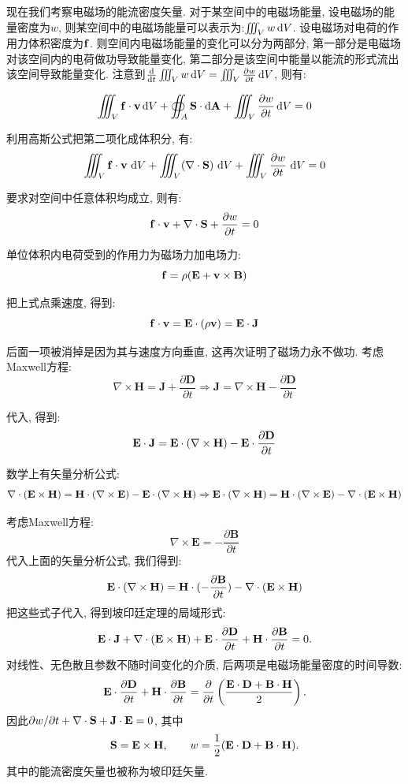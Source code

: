 现在我们考察电磁场的能流密度矢量. 对于某空间中的电磁场能量, 设电磁场的能量密度为$w$, 则某空间中的电磁场能量可以表示为:$\iiint_V w\mathop{}\!\mathrm{d} V$. 设电磁场对电荷的作用力体积密度为$\mathbf{f}$. 则空间内电磁场能量的变化可以分为两部分, 第一部分是电磁场对该空间内的电荷做功导致能量变化, 第二部分是该空间中能量以能流的形式流出该空间导致能量变化. 注意到$\frac{\mathop{}\!\mathrm{d}}{\mathop{}\!\mathrm{d} t}\iiint_V w\mathop{}\!\mathrm{d} V=\iiint_V  \frac{\partial w}{\partial t}\mathop{}\!\mathrm{d} V$, 则有:

\[
\iiint_V \mathbf{f}\cdot \mathbf{v} \mathop{}\!\mathrm{d} V + \oiint_A \mathbf{S} \cdot \mathop{}\!\mathrm{d} \mathbf{A}+\iiint_V  \frac{\partial w}{\partial t}\mathop{}\!\mathrm{d} V = 0
\]

利用高斯公式把第二项化成体积分, 有:
\[
\iiint_V \mathbf{f}\cdot \mathbf{v}\,\mathop{}\!\mathrm{d} V + \iiint_V (\nabla \cdot \mathbf{S})\,\mathop{}\!\mathrm{d} V +\iiint_V \frac{\partial w}{\partial t}\,\mathop{}\!\mathrm{d} V = 0
\]

要求对空间中任意体积均成立, 则有:
\[
 \mathbf{f}\cdot \mathbf{v}  +  \nabla \cdot \mathbf{S} + \frac{\partial w}{\partial t} = 0
\]

单位体积内电荷受到的作用力为磁场力加电场力:
\[
\mathbf{f} = \rho(\mathbf{E}+\mathbf{v}\times\mathbf{B})
\]

把上式点乘速度, 得到:
\[
\mathbf{f}\cdot \mathbf{v} = \mathbf{E} \cdot (\rho \mathbf{v}) = \mathbf{E} \cdot \mathbf{J}
\]

后面一项被消掉是因为其与速度方向垂直, 这再次证明了磁场力永不做功. 考虑Maxwell方程:
\[
\nabla\times\mathbf{H} = \mathbf{J} + \frac{\partial\mathbf{D}}{\partial t} \Rightarrow \mathbf{J} = \nabla\times\mathbf{H} - \frac{\partial\mathbf{D}}{\partial t}
\]

代入, 得到:
\[
\mathbf{E} \cdot \mathbf{J} = \mathbf{E} \cdot (\nabla\times\mathbf{H}) -  \mathbf{E} \cdot\frac{\partial\mathbf{D}}{\partial t}
\]

数学上有矢量分析公式:
\[
\nabla \cdot(\mathbf{E} \times \mathbf{H}) = \mathbf{H}\cdot(\nabla \times \mathbf{E}) - \mathbf{E}\cdot (\nabla \times \mathbf{H}) \Rightarrow \mathbf{E}\cdot (\nabla \times \mathbf{H})  = \mathbf{H}\cdot(\nabla \times \mathbf{E}) - \nabla \cdot(\mathbf{E} \times \mathbf{H})
\]

考虑Maxwell方程:
\[
\nabla\times\mathbf{E} = -\frac{\partial\mathbf{B}}{\partial t}
\]
代入上面的矢量分析公式, 我们得到:
\[
\mathbf{E}\cdot (\nabla \times \mathbf{H}) = \mathbf{H}\cdot (-\frac{\partial\mathbf{B}}{\partial t})- \nabla \cdot(\mathbf{E} \times \mathbf{H})
\]
把这些式子代入, 得到坡印廷定理的局域形式:
\[
\mathbf{E}\cdot\mathbf{J}+\nabla\cdot(\mathbf{E}\times\mathbf{H})
+\mathbf{E}\cdot\frac{\partial\mathbf{D}}{\partial t}
+\mathbf{H}\cdot\frac{\partial\mathbf{B}}{\partial t}=0.
\]
对线性、无色散且参数不随时间变化的介质, 后两项是电磁场能量密度的时间导数:
\[
\mathbf{E}\cdot\frac{\partial\mathbf{D}}{\partial t}
+\mathbf{H}\cdot\frac{\partial\mathbf{B}}{\partial t}
=\frac{\partial}{\partial t}
\left(\frac{\mathbf{E}\cdot\mathbf{D}+\mathbf{B}\cdot\mathbf{H}}{2}\right).
\]
因此$\partial w/\partial t+\nabla\cdot\mathbf{S}+\mathbf{J}\cdot\mathbf{E}=0$, 其中
\[
\mathbf{S}=\mathbf{E}\times\mathbf{H},\qquad
w=\frac{1}{2}(\mathbf{E}\cdot\mathbf{D}+\mathbf{B}\cdot\mathbf{H}).
\]
其中的能流密度矢量也被称为坡印廷矢量.

